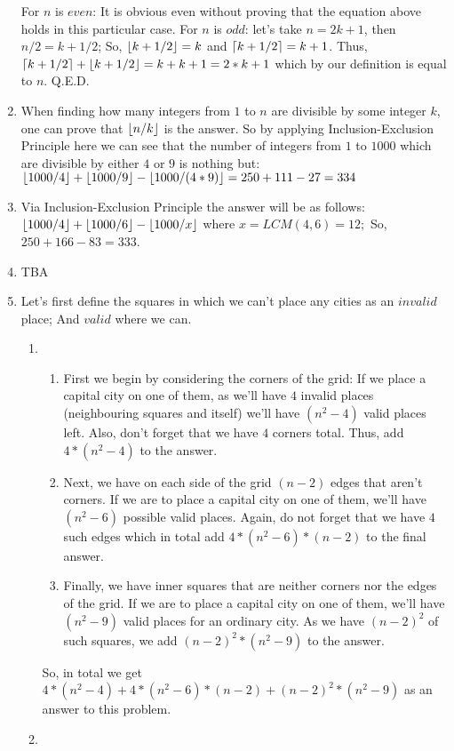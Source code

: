 \documentclass[12pt]{article}
\DeclarePairedDelimiter{\ceil}{\lceil}{\rceil}
\DeclarePairedDelimiter{\floor}{\lfloor}{\rfloor}
\begin{document}
\begin{enumerate}
    For $n$ is $even$: It is obvious even without proving that the equation above holds in this particular case. \newline
    For $n$ is $odd$: let's take $n = 2k + 1$, then $n/2 = k + 1/2$; \newline
    So, $\floor{k + 1/2} = k$ and $\ceil{k + 1/2} = k + 1$. \newline
    Thus, $\ceil{k + 1/2} + \floor{k + 1/2} = k + k + 1 = 2*k + 1$ which by our definition is equal to $n$. \newline Q.E.D.
  \item
    When finding how many integers from $1$ to $n$ are divisible by some integer $k$, one can prove that $\floor{n/k}$ is the answer. \newline \newline
    So by applying Inclusion-Exclusion Principle here we can see that the number of integers from $1$ to $1000$ which are divisible by either $4$ or $9$ is nothing but: \newline
    $\floor{1000/4} + \floor{1000/9} - \floor{1000/(4*9)} = 250 + 111 - 27 = 334$
  \item
    Via Inclusion-Exclusion Principle the answer will be as follows: \newline
    $\floor{1000/4} + \floor{1000/6} - \floor{1000/x}$ where $x = LCM(4, 6) = 12;$ \newline
    So, $250 + 166 - 83 = 333$.
  \item
    TBA
  \item
    Let's first define the squares in which we can't place any cities as an $invalid$ place; And $valid$ where we can.
    \begin{enumerate}
      \item
        \begin{enumerate}
          \item First we begin by considering the corners of the grid: \newline
            If we place a capital city on one of them, as we'll have $4$ invalid places (neighbouring squares and itself) we'll have $(n^2 - 4)$ valid places left. Also, don't forget that we have $4$ corners total. Thus, add $4 * (n^2 - 4)$ to the answer.
          \item Next, we have on each side of the grid $(n - 2)$ edges that aren't corners. If we are to place a capital city on one of them, we'll have $(n^2 - 6)$ possible valid places. Again, do not forget that we have $4$ such edges which in total add $4 * (n^2 - 6) * (n - 2)$ to the final answer.
          \item Finally, we have inner squares that are neither corners nor the edges of the grid. If we are to place a capital city on one of them, we'll have $(n^2 - 9)$ valid places for an ordinary city. As we have $(n-2)^2$ of such squares, we add $(n-2)^2 * (n^2-9)$ to the answer.
        \end{enumerate}
        So, in total we get $4*(n^2-4) + 4*(n^2 - 6)*(n-2) + (n - 2)^2 * (n^2-9)$ as an answer to this problem.
      \item
    \end{enumerate}
\end{enumerate}
\end{document}
